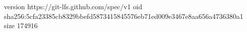 version https://git-lfs.github.com/spec/v1
oid sha256:5cfa23385cb8329bbefd5873415845576eb71ed009e3467e8aa656a4736380a1
size 174916
